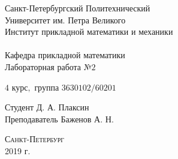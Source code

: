 \documentclass[a4]{article}
\begin{document}
\def\contentsname{\LARGE{Содержание}}
\thispagestyle{empty}
\begin{center} 
\vspace{2cm} 
{\Large \sc Санкт-Петербургский Политехнический}\\
\vspace{2mm}
{\Large \sc Университет} им. {\Large\sc Петра Великого}\\
\vspace{1cm}
{\large \sc Институт прикладной математики и механики\\ 
\vspace{0.5mm}
\textsc{}}\\ 
\vspace{0.5mm}
{\large\sc Кафедра прикладной математики}\\
\vspace{15mm}
{\huge \sc Лабораторная работа №$2$\\
\vspace{6mm}
 }
\vspace*{2mm}
\vspace{1cm}

{\sc $4$ курс$,$ группа $3630102/60201$}

\vspace{2cm} 
Студент \hfill Д. А. Плаксин\\
\vspace{1cm}
Преподаватель \hfill Баженов А. Н.\\
\vspace{20mm} 

\end{center} 
\begin{center}
\vfill {\large\textsc{Санкт-Петербург}}\\ 
2019 г.
\end{center}

\end{document}
